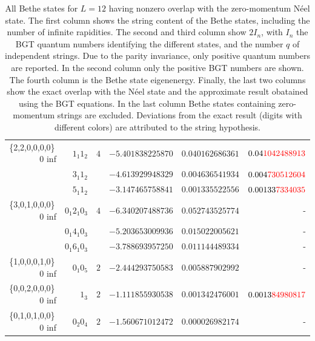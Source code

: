 \documentclass[11pt]{iopart}
\begin{document}
\begin{table}[h]
\begin{tabular}{rrrrrr}
\midrule
\{2,2,0,0,0,0\}\, 0 inf &$1_1 1_2$ & $4$ & $-5.401838225870$ & $0.040162686361$ & $0.04{\color{red}1042488913}$\\  
&$3_1 1_2 $ & & $-4.613929948329$ & $0.004636541934$ & $0.004{\color{red}730512604}$\\
  &$5_1 1_2 $ &  & $-3.147465758841$ & $0.001335522556$ & $0.00133{\color{red}7334035}$\\
\midrule
\{3,0,1,0,0,0\}\, 0 inf &$0_1 2_1 0_3$ & $4$ & $-6.340207488736$ & $0.052743525774$ & -\\
  &$0_1 4_1 0_3$ & & $-5.203653009936$ & $0.015022005621$ & - \\
  &$0_1 6_1 0_3$ & & $-3.788693957250$ & $0.011144489334$ & - \\
\midrule
\{1,0,0,0,1,0\}\, 0 inf &$0_1 0_5$ & $2$ & $-2.444293750583$ & $0.005887902992$ & - \\
\midrule
\{0,0,2,0,0,0\}\, 0 inf &$1_3$ & $2$ & $-1.111855930538$ & $0.001342476001$ & $0.0013{\color{red}84980817}$ \\
\midrule
\{0,1,0,1,0,0\}\, 0 inf &$0_2 0_4$ & $2$ &  $-1.560671012472$ & $0.000026982174$ & - \\
\bottomrule
\end{tabular}
\caption{All Bethe states for $L=12$ having nonzero overlap with the zero-momentum N\'eel state. 
 The first column shows the string content of the Bethe states, including the number of infinite 
 rapidities. The second and third column show $2I_n$, with $I_n$ the BGT quantum numbers 
 identifying the different states, and the number $q$ of independent strings. Due to the parity invariance, 
 only positive quantum numbers are reported. In the second 
 column only the positive BGT numbers are shown. The fourth column is the Bethe state eigenenergy. 
 Finally, the last two columns show the exact overlap with the N\'eel state and the approximate 
 result obatained using the BGT equations. In the last column Bethe states containing zero-momentum 
 strings are excluded. Deviations from the exact result (digits with different colors) are 
 attributed to the string hypothesis. 
}
\label{table:neel}
\end{table}
\end{document}
